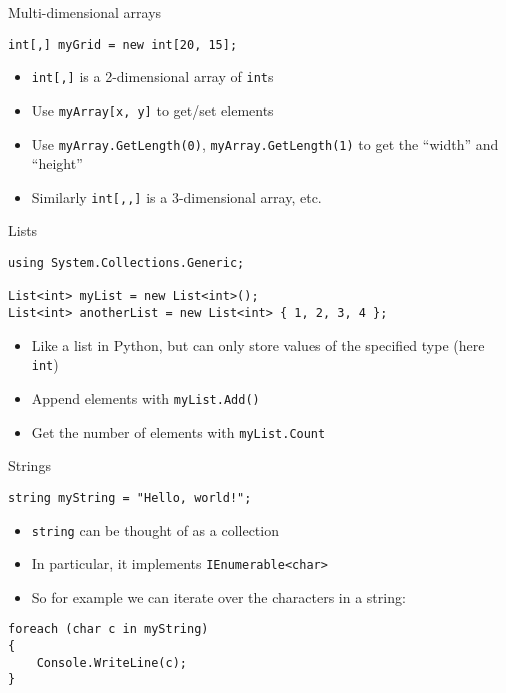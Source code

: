 \begin{frame}[fragile]{Multi-dimensional arrays}
    \begin{lstlisting}
int[,] myGrid = new int[20, 15];
    \end{lstlisting}
    \begin{itemize}
        \pause\item \lstinline{int[,]} is a 2-dimensional array of \lstinline{int}s
        \pause\item Use \lstinline{myArray[x, y]} to get/set elements
        \pause\item Use \lstinline{myArray.GetLength(0)}, \lstinline{myArray.GetLength(1)} to get the ``width'' and ``height''
        \pause\item Similarly \lstinline{int[,,]} is a 3-dimensional array, etc.
    \end{itemize}
\end{frame}

\begin{frame}[fragile]{Lists}
    \begin{lstlisting}
using System.Collections.Generic;

List<int> myList = new List<int>();
List<int> anotherList = new List<int> { 1, 2, 3, 4 };
    \end{lstlisting}
	\begin{itemize}
		\pause\item Like a list in Python, but can only store values of the specified type (here \lstinline{int})
		\pause\item Append elements with \lstinline{myList.Add()}
		\pause\item Get the number of elements with \lstinline{myList.Count}
	\end{itemize}
\end{frame}

\begin{frame}[fragile]{Strings}
    \begin{lstlisting}
string myString = "Hello, world!";
    \end{lstlisting}
	\begin{itemize}
		\pause\item \lstinline{string} can be thought of as a collection
		\pause\item In particular, it implements \lstinline{IEnumerable<char>}
		\pause\item So for example we can iterate over the characters in a string:
	\end{itemize}
    \begin{lstlisting}
foreach (char c in myString)
{
	Console.WriteLine(c);
}
	\end{lstlisting}
\end{frame}

